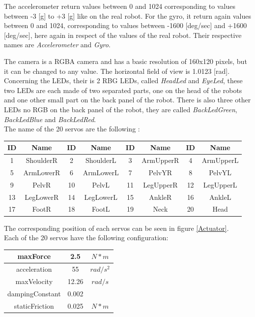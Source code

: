 \documentclass[a4paper, 12pt]{article}  		%
\begin{document}
The accelerometer return values between 0 and 1024 corresponding to values between -3 [g] to +3 [g] like on the real robot. For the gyro, it return again values between 0 and 1024, corresponding to values between -1600 [deg/sec] and +1600 [deg/sec], here again in respect of the values of the real robot. Their respective names are \textit{Accelerometer} and \textit{Gyro}.

The camera is a RGBA camera and has a basic resolution of 160x120 pixels, but it can be changed to any value. The horizontal field of view is 1.0123 [rad].\\

Concerning the LEDs, their is 2 RBG LEDs, called \textit{HeadLed} and \textit{EyeLed}, these two LEDs are each made of two separated parts, one on the head of the robots and one other small part on the back panel of the robot. There is also three other LEDs no RGB on the back panel of the robot, they are called \textit{BackLedGreen}, \textit{BackLedBlue} and \textit{BackLedRed}.\\

The name of the 20 servos are the following :

\begin{table}[H]
\begin{center}
\begin{tabular}{ | c | c | c | c | c | c | c | c |  }
\hline
ID & Name & ID & Name & ID & Name & ID & Name\\ 
\hline
\hline
1 & ShoulderR & 2 & ShoulderL & 3 & ArmUpperR & 4 & ArmUpperL \\
\hline
5 & ArmLowerR & 6 & ArmLowerL & 7 & PelvYR & 8 & PelvYL \\
\hline
9 & PelvR & 10 & PelvL & 11 & LegUpperR & 12 & LegUpperL \\
\hline
13 & LegLowerR & 14 & LegLowerL & 15 & AnkleR & 16 & AnkleL \\
\hline
17 & FootR & 18 & FootL & 19 & Neck & 20 & Head \\
\hline
\end{tabular}
\label{tab::servosName}
\end{center}
\end{table}

The corresponding position of each servos can be seen in figure \ref{Actuator}.\\
Each of the 20 servos have the following configuration:
\begin{table}[H]
\begin{center}
\begin{tabular}{ | c | c | c | }
\hline
maxForce & 2.5 & $N*m$ \\ 
\hline
acceleration & 55 & $rad/s^{2}$ \\ 
\hline
maxVelocity & 12.26 & $rad/s$ \\ 
\hline
dampingConstant & 0.002 & $ $ \\ 
\hline
staticFriction & 0.025 & $N*m$ \\ 
\hline
\end{tabular}
\label{tab::servosConfig}
\end{center}
\end{table}
\end{document}
